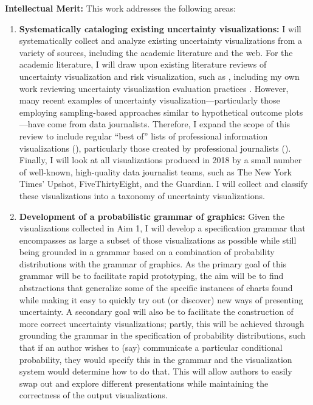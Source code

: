 \documentclass[11pt]{article}
\begin{document}
\noindent\textbf{Intellectual Merit:} This work addresses the following areas:

\vspace{-0.75em}
\begin{enumerate}[noitemsep]
  \item \textbf{Systematically cataloging existing uncertainty visualizations:} I will systematically collect and analyze existing uncertainty visualizations from a variety of sources, including the academic literature and the web. For the academic literature, I will draw upon existing literature reviews of uncertainty visualization and risk visualization, such as 
\cite{MacEachren1992,Ancker2006,Garcia-Retamero2013,maceachren_visualizing_2005}
, including my own work reviewing uncertainty visualization evaluation practices \cite{hullman2018pursuit}. However, many recent examples of uncertainty visualization---particularly those employing sampling-based approaches similar to hypothetical outcome plots---have come from data journalists. Therefore, I expand the scope of this review to include regular ``best of'' lists of professional information visualizations (\eg \cite{kirk2018march_best_of_vis}), particularly those created by professional journalists (\eg \cite{noauthor_forecasting_nodate}). Finally, I will look at all visualizations produced in 2018 by a small number of well-known, high-quality data journalist teams, such as The New York Times’ Upshot, FiveThirtyEight, and the Guardian. I will collect and classify these visualizations into a taxonomy of uncertainty visualizations.
  \item \textbf{Development of a probabilistic grammar of graphics:} Given the visualizations collected in Aim 1, I will develop a specification grammar that encompasses as large a subset of those visualizations as possible while still being grounded in a grammar based on a combination of probability distributions with the grammar of graphics. As the primary goal of this grammar will be to facilitate rapid prototyping, the aim will be to find abstractions that generalize some of the specific instances of charts found while making it easy to quickly try out (or discover) new ways of presenting uncertainty. A secondary goal will also be to facilitate the construction of more correct uncertainty visualizations; partly, this will be achieved through grounding the grammar in the specification of probability distributions, such that if an author wishes to (say) communicate a particular conditional probability, they would specify this in the grammar and the visualization system would determine how to do that. This will allow authors to easily swap out and explore different presentations while maintaining the correctness of the output visualizations.

\end{enumerate}
\end{document}
